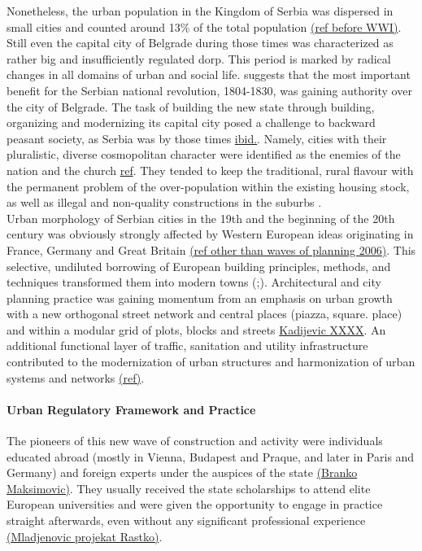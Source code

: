 \documentclass[11pt]{report}
\begin{document}
Nonetheless, the urban population in the Kingdom of Serbia was dispersed in small cities and counted around 13\% of the total population \href{ref}{(ref before WWI)}. Still even the capital city of Belgrade during those times was characterized as rather big and insufficiently regulated dorp.
This period is marked by radical changes in all domains of urban and social life. 
\href{Samardzic}{\citealt{doytchinov_belgrade_2015}} suggests that the most important benefit for the Serbian national revolution, 1804-1830, was gaining authority over the city of Belgrade. The task of building the new state through building, organizing and modernizing its capital city posed a challenge to backward peasant society, as Serbia was by those times \href{Samardzic}{ibid.}. Namely, cities with their pluralistic, diverse cosmopolitan character were identified as the enemies of the nation and the church \href{ref}{ref}. They tended to keep the traditional, rural flavour with the permanent problem of the over-population within the existing housing stock, as well as illegal and non-quality constructions in the suburbs \href{ref}{\citealt{doytchinov_modernization_2015}}.
\\  

Urban morphology of Serbian cities in the 19th and the beginning of the 20th century was obviously strongly affected by Western European ideas originating in France, Germany and Great Britain \href{ref}{(ref other than waves of planning 2006)}. This selective, undiluted borrowing of European building principles, methods, and techniques transformed them into modern towns (\href{ref}{\citealt{nedovicbudic_waves_2006}};\href{ref}{\citealt{ Kadijevic XXXX)}}). Architectural and city planning practice was gaining momentum from an emphasis on urban growth with a new orthogonal street network and central places (piazza, square. place) and within a modular grid of plots, blocks and streets \href{ref}{Kadijevic XXXX}. An additional functional layer of traffic, sanitation and utility infrastructure contributed to the modernization of urban structures and harmonization of urban systems and networks \href{ref}{(ref)}.

\paragraph{Urban Regulatory Framework and Practice}

The pioneers of this new wave of construction and activity were individuals educated abroad (mostly in Vienna, Budapest and Praque, and later in Paris and Germany) and foreign experts under the auspices of the state \href{ref}{(Branko Maksimovic)}. They usually received the state scholarships to attend elite European universities and were given the opportunity to engage in practice straight afterwards, even without any significant professional experience \href{ref}{(Mladjenovic projekat Rastko)}.
\\
\end{document}
